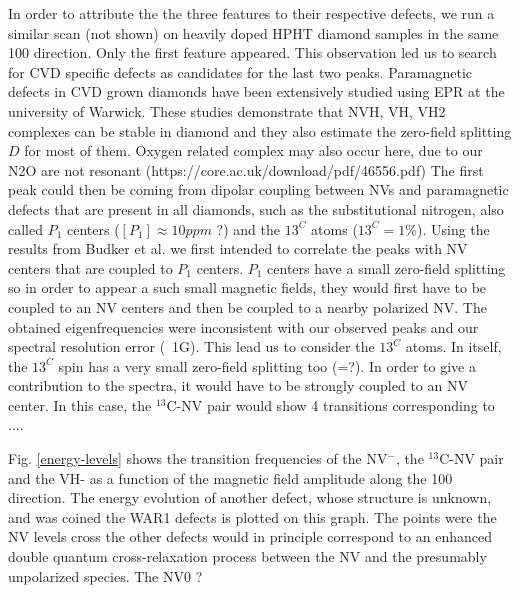\documentclass[9pt,twocolumn,twoside]{osajnl}
\begin{document}
In order to attribute the the three features to their respective defects, we run a similar scan (not shown) on heavily doped HPHT diamond samples in the same 100 direction. Only the first feature appeared. 
This observation led us to search for CVD specific defects as candidates for the last two peaks. Paramagnetic defects in CVD grown diamonds have been extensively studied using EPR at the university of Warwick. These studies demonstrate that  NVH, VH, VH2 complexes can be stable in diamond and they also estimate the zero-field splitting $D$ for most of them.
Oxygen related complex may also occur here, due to our N2O are not resonant (https://core.ac.uk/download/pdf/46556.pdf)
The first peak could then be coming from dipolar coupling between NVs and paramagnetic defects that are present in all diamonds, such as the substitutional nitrogen, also called $P_1$ centers ($[P_1]\approx 10 ppm$ ?) and the ${13}^C$ atoms (${13}^C= 1\%$). 
Using the results from Budker et al. we first intended to correlate the peaks with NV centers that are coupled to $P_1$ centers. 
 $P_1$ centers have a small zero-field splitting so in order to appear a such small magnetic fields, they would first have to be coupled to an NV centers and then be coupled to a nearby polarized NV.
The obtained eigenfrequencies were inconsistent with our observed peaks and our spectral resolution error (~1G). This lead us to consider the ${13}^C$ atoms. 
In itself, the ${13}^C$ spin has a very small zero-field splitting too (=?). In order to give a contribution to the spectra, it would have to be strongly coupled to an NV center. 
In this case, the $^{13}$C-NV pair would show 4 transitions corresponding to ....

Fig. \ref{energy-levels} shows the transition frequencies of the NV$^-$, the $^{13}$C-NV pair and the VH- as a function of the magnetic field amplitude along the 100 direction.
The energy evolution of another defect, whose structure is unknown, and was coined the WAR1 defects is plotted on this graph. 
The points were the NV levels cross the other defects would in principle correspond to an enhanced double quantum cross-relaxation process between the NV and the presumably unpolarized species. 
The NV0 ?
\end{document}
